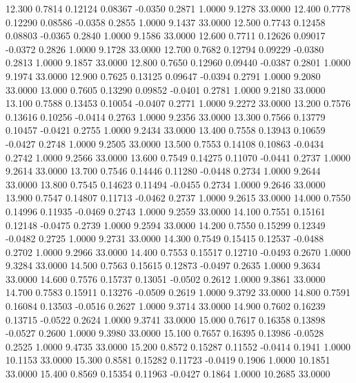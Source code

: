   12.300   0.7814   0.12124   0.08367  -0.0350   0.2871   1.0000   9.1278  33.0000
  12.400   0.7778   0.12290   0.08586  -0.0358   0.2855   1.0000   9.1437  33.0000
  12.500   0.7743   0.12458   0.08803  -0.0365   0.2840   1.0000   9.1586  33.0000
  12.600   0.7711   0.12626   0.09017  -0.0372   0.2826   1.0000   9.1728  33.0000
  12.700   0.7682   0.12794   0.09229  -0.0380   0.2813   1.0000   9.1857  33.0000
  12.800   0.7650   0.12960   0.09440  -0.0387   0.2801   1.0000   9.1974  33.0000
  12.900   0.7625   0.13125   0.09647  -0.0394   0.2791   1.0000   9.2080  33.0000
  13.000   0.7605   0.13290   0.09852  -0.0401   0.2781   1.0000   9.2180  33.0000
  13.100   0.7588   0.13453   0.10054  -0.0407   0.2771   1.0000   9.2272  33.0000
  13.200   0.7576   0.13616   0.10256  -0.0414   0.2763   1.0000   9.2356  33.0000
  13.300   0.7566   0.13779   0.10457  -0.0421   0.2755   1.0000   9.2434  33.0000
  13.400   0.7558   0.13943   0.10659  -0.0427   0.2748   1.0000   9.2505  33.0000
  13.500   0.7553   0.14108   0.10863  -0.0434   0.2742   1.0000   9.2566  33.0000
  13.600   0.7549   0.14275   0.11070  -0.0441   0.2737   1.0000   9.2614  33.0000
  13.700   0.7546   0.14446   0.11280  -0.0448   0.2734   1.0000   9.2644  33.0000
  13.800   0.7545   0.14623   0.11494  -0.0455   0.2734   1.0000   9.2646  33.0000
  13.900   0.7547   0.14807   0.11713  -0.0462   0.2737   1.0000   9.2615  33.0000
  14.000   0.7550   0.14996   0.11935  -0.0469   0.2743   1.0000   9.2559  33.0000
  14.100   0.7551   0.15161   0.12148  -0.0475   0.2739   1.0000   9.2594  33.0000
  14.200   0.7550   0.15299   0.12349  -0.0482   0.2725   1.0000   9.2731  33.0000
  14.300   0.7549   0.15415   0.12537  -0.0488   0.2702   1.0000   9.2966  33.0000
  14.400   0.7553   0.15517   0.12710  -0.0493   0.2670   1.0000   9.3284  33.0000
  14.500   0.7563   0.15615   0.12873  -0.0497   0.2635   1.0000   9.3634  33.0000
  14.600   0.7576   0.15737   0.13051  -0.0502   0.2612   1.0000   9.3861  33.0000
  14.700   0.7583   0.15911   0.13276  -0.0509   0.2619   1.0000   9.3792  33.0000
  14.800   0.7591   0.16084   0.13503  -0.0516   0.2627   1.0000   9.3714  33.0000
  14.900   0.7602   0.16239   0.13715  -0.0522   0.2624   1.0000   9.3741  33.0000
  15.000   0.7617   0.16358   0.13898  -0.0527   0.2600   1.0000   9.3980  33.0000
  15.100   0.7657   0.16395   0.13986  -0.0528   0.2525   1.0000   9.4735  33.0000
  15.200   0.8572   0.15287   0.11552  -0.0414   0.1941   1.0000  10.1153  33.0000
  15.300   0.8581   0.15282   0.11723  -0.0419   0.1906   1.0000  10.1851  33.0000
  15.400   0.8569   0.15354   0.11963  -0.0427   0.1864   1.0000  10.2685  33.0000
